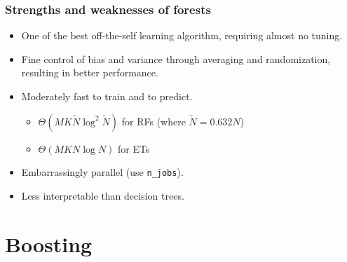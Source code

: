 \documentclass{beamer}
\begin{document}
\begin{frame}
  \frametitle{Strengths and weaknesses of forests}

  \begin{itemize}
    \item One of the best off-the-self learning algorithm, requiring almost
          no tuning.

    \vspace{0.25cm}

    \item {\color{blue}Fine control} of bias and variance through averaging
          and randomization, resulting in {\color{blue} better performance}.

    \vspace{0.25cm}

    \item Moderately fast to train and to predict.
        \begin{itemize}
            \item $\Theta(MK\widetilde{N}\log^2 \widetilde{N})$ for RFs (where $\widetilde{N} = 0.632N$)
            \item $\Theta(MKN\log N)$ for ETs
        \end{itemize}

    \vspace{0.25cm}

    \item Embarrassingly {\color{blue} parallel} (use \texttt{n\_jobs}).

    \vspace{0.25cm}

    \item {\color{red} Less interpretable} than decision trees.
  \end{itemize}
\end{frame}






\section{Boosting}
\end{document}
